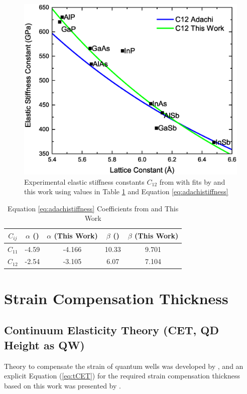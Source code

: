 \documentclass{article}
\begin{document}
\begin{figure}
	\includegraphics[width=0.85\linewidth]{C12}
	\centering
	\caption{Experimental elastic stiffness constants \(C_{12}\) from \cite{vurgaftman_band_2001} with fits by \cite{adachi_properties_2005} and this work using values in Table \ref{table:stiffnesscalccoeff} and Equation \ref{eq:adachistiffness}}
	\label{fig:C12}
\end{figure}

\begin{table}
	\caption{Equation \ref{eq:adachistiffness} Coefficients from \citeauthor{adachi_properties_2005} \cite{adachi_properties_2005} and This Work}
	\centering
	\begin{tabular}{c c c c c}
		\hline\hline
		$C_{ij}$ & \(\alpha\) (\citeauthor{adachi_properties_2005}) & \(\alpha\) (This Work) & \(\beta\) (\citeauthor{adachi_properties_2005}) & \(\beta\) (This Work) \\ %
		\hline %
		\(C_{11}\) & -4.59 & -4.166 & 10.33 & 9.701 \\
		\(C_{12}\) & -2.54 & -3.105 & 6.07 & 7.104 \\ %
		\hline
	\end{tabular}
	\label{table:stiffnesscalccoeff} %
\end{table}
\FloatBarrier
\section{Strain Compensation Thickness}
\label{straincomp}
\subsection{Continuum Elasticity Theory (CET, QD Height as QW)}
Theory to compensate the strain of quantum wells was developed by \citeauthor{ekins-daukes_strain-balanced_2002} \cite{ekins-daukes_strain-balanced_2002}, and an explicit Equation (\ref{eq:tCET}) for the required strain compensation thickness based on this work was presented by \citeauthor{bailey_evaluation_2009} \cite{bailey_evaluation_2009}.
\end{document}
